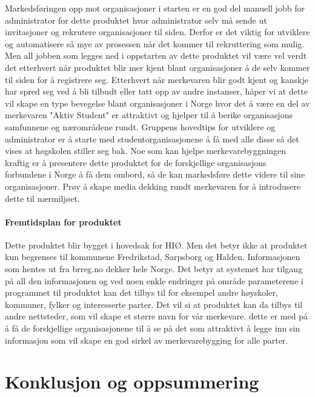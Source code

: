 Markedsføringen opp mot organisasjoner i starten er en god del manuell jobb for administrator for dette produktet hvor administrator selv må sende ut invitasjoner og rekrutere organisasjoner til siden. Derfor er det viktig for utviklere og automatisere så mye av prosessen når det kommer til rekruttering som mulig. Men all jobben som legges ned i oppstarten av dette produktet vil være vel verdt det etterhvert når produktet blir mer kjent blant organisasjoner å de selv kommer til siden for å registrere seg. Etterhvert når merkevaren blir godt kjent og kanskje har spred seg ved å bli tilbudt eller tatt opp av andre instanser, håper vi at dette vil skape en type bevegelse blant organisasjoner i Norge hvor det å være en del av merkevaren "Aktiv Student" er attraktivt og hjelper til å berike organisasjons samfunnene og nærområdene rundt. Gruppens hovedtips for utviklere og administrator er å starte med studentorganisasjonene å få med alle disse så det vises at høgskolen stiller seg bak. Noe som kan hjelpe merkevarebyggningen kraftig er å presentere dette produktet for de forskjellige organisasjons forbundene i Norge å få dem ombord, så de kan markedsføre dette videre til sine organisasjoner. Prøv å skape media dekking rundt merkevaren for å introdusere dette til nærmiljøet. 

\paragraph{Fremtidsplan for produktet}

Dette produktet blir bygget i hovedsak for HIØ. Men det betyr ikke at produktet kun begrenses til kommunene Fredrikstad, Sarpsborg og Halden. Informasjonen som hentes ut fra brreg.no dekker hele Norge. Det betyr at systemet har tilgang på all den informasjonen og ved noen enkle endringer på område parameterene i programmet til produktet kan det tilbys til for eksempel andre høyskoler, kommuner, fylker og interesserte parter. Det vil si at produktet kan da tilbys til andre nettsteder, som vil skape et større navn for vår merkevare. dette er med på å få de forskjellige organisasjonene til å se på det som attraktivt å legge inn sin informasjon som vil skape en god sirkel av merkevarebygging for alle parter.


\section{Konklusjon og oppsummering}








